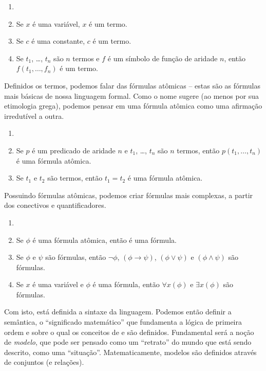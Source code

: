 \newpage
\begin{defn}[Termo]
\begin{enumerate}
\item[]
\item Se $x$ é uma variável, $x$ é um termo.
\item Se $c$ é uma constante, $c$ é um termo.
\item Se $t_1$, \dots, $t_n$ são $n$ termos e $f$ é um símbolo de função de aridade $n$, então $f(t_1,\dots,f_n)$ é um termo.
\end{enumerate}
\end{defn}

Definidos os termos, podemos falar das fórmulas atômicas -- estas são as fórmulas mais básicas de nossa linguagem formal. Como o nome sugere (ao menos por sua etimologia grega), podemos pensar em uma fórmula atômica como uma afirmação irredutível a outra.

\begin{defn}
\begin{enumerate}
\item []
\item Se $p$ é um predicado de aridade $n$ e $t_1$, \dots, $t_n$ são $n$ termos, então $p(t_1,\dots,t_n)$ é uma fórmula atômica.
\item Se $t_1$ e $t_2$ são termos, então $t_1 = t_2$ é uma fórmula atômica.
\end{enumerate}
\end{defn}

Possuindo fórmulas atômicas, podemos criar fórmulas mais complexas, a partir dos conectivos e quantificadores.

\begin{defn}[Fórmula]
\begin{enumerate}
\item[]
\item Se $\phi$ é uma fórmula atômica, então é uma fórmula.
\item Se $\phi$ e $\psi$ são fórmulas, então $\neg \phi$, $(\phi \rightarrow \psi)$, $(\phi \lor \psi)$ e $(\phi \land \psi)$ são fórmulas.
\item Se $x$ é uma variável e $\phi$ é uma fórmula, então $\forall x(\phi)$ e $\exists x(\phi)$ são fórmulas.
\end{enumerate}
\end{defn}

Com isto, está definida a sintaxe da linguagem. Podemos então definir a semântica, o ``significado matemático'' que fundamenta a lógica de primeira ordem e sobre o qual os conceitos de  e  são definidos. Fundamental será a noção de \textit{modelo}, que pode ser pensado como um ``retrato'' do mundo que está sendo descrito, como uma ``situação''. Matematicamente, modelos são definidos através de conjuntos (e relações).


